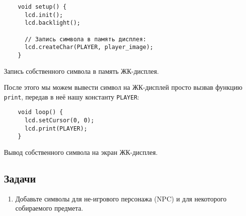 \documentclass[../sparc.tex]{subfiles}
\begin{document}
\begin{listing}[H]
  \begin{verbatim}
    void setup() {
      lcd.init();
      lcd.backlight();

      // Запись символа в память дисплея:
      lcd.createChar(PLAYER, player_image);
    }
  \end{verbatim}
  \caption{Запись собственного символа в память ЖК-дисплея.}
  \label{listing:game-dev-lcd-create-char}
\end{listing}

После этого мы можем вывести символ на ЖК-дисплей просто вызвав функцию
\texttt{print}, передав в неё нашу константу \texttt{PLAYER}:

\begin{listing}[H]
  \begin{verbatim}
    void loop() {
      lcd.setCursor(0, 0);
      lcd.print(PLAYER);
    }
  \end{verbatim}
  \caption{Вывод собственного символа на экран ЖК-дисплея.}
  \label{listing:game-dev-lcd-print}
\end{listing}

\subsection{Задачи}
\begin{enumerate}
\item Добавьте символы для не-игрового персонажа (\gls{NPC}) и для некоторого
  собираемого предмета.
\end{enumerate}
\end{document}
